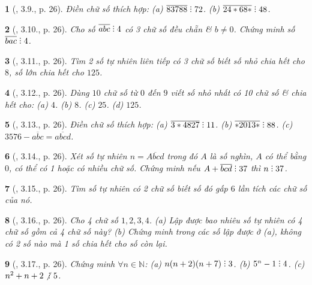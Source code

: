 \documentclass{article}
\newtheorem{baitoan}{}
\DeclareRobustCommand{\divby}{%
	\mathrel{\vbox{\baselineskip.65ex\lineskiplimit0pt\hbox{.}\hbox{.}\hbox{.}}}%
}
\begin{document}
\begin{baitoan}[\cite{TLCT_THCS_Toan_6_so_hoc}, 3.9., p. 26]
	Điền chữ số thích hợp: (a) $\overline{83788}\divby72$. (b) $\overline{24*68*}\divby48$.
\end{baitoan}

\begin{baitoan}[\cite{TLCT_THCS_Toan_6_so_hoc}, 3.10., p. 26]
	Cho số $\overline{abc}\divby4$ có 3 chữ số đều chẵn \& $b\ne0$. Chứng minh số $\overline{bac}\divby4$.
\end{baitoan}

\begin{baitoan}[\cite{TLCT_THCS_Toan_6_so_hoc}, 3.11., p. 26]
	Tìm 2 số tự nhiên liên tiếp có 3 chữ số biết số nhỏ chia hết cho $8$, số lớn chia hết cho $125$.
\end{baitoan}

\begin{baitoan}[\cite{TLCT_THCS_Toan_6_so_hoc}, 3.12., p. 26]
	Dùng $10$ chữ số từ $0$ đến $9$ viết số nhỏ nhất có 10 chữ số \& chia hết cho: (a) $4$. (b) $8$. (c) $25$. (d) $125$.
\end{baitoan}

\begin{baitoan}[\cite{TLCT_THCS_Toan_6_so_hoc}, 3.13., p. 26]
	Điền chữ số thích hợp: (a) $\overline{3*4827}\divby11$. (b) $\overline{*2013*}\divby88$. (c) $3576 - \overline{abc} = \overline{abcd}$.
\end{baitoan}

\begin{baitoan}[\cite{TLCT_THCS_Toan_6_so_hoc}, 3.14., p. 26]
	Xét số tự nhiên $n = \overline{Abcd}$ trong đó $A$ là số nghìn, $A$ có thể bằng $0$, có thể có 1 hoặc có nhiều chữ số. Chứng minh nếu $A + \overline{bcd}\divby37$ thì $n\divby37$.
\end{baitoan}

\begin{baitoan}[\cite{TLCT_THCS_Toan_6_so_hoc}, 3.15., p. 26]
	Tìm số tự nhiên có 2 chữ số biết số đó gấp $6$ lần tích các chữ số của nó.
\end{baitoan}

\begin{baitoan}[\cite{TLCT_THCS_Toan_6_so_hoc}, 3.16., p. 26]
	Cho 4 chữ số $1,2,3,4$. (a) Lập được bao nhiêu số tự nhiên có 4 chữ số gồm cả 4 chữ số này? (b) Chứng minh trong các số lập được ở (a), không có 2 số nào mà 1 số chia hết cho số còn lại.
\end{baitoan}

\begin{baitoan}[\cite{TLCT_THCS_Toan_6_so_hoc}, 3.17., p. 26]
	Chứng minh $\forall n\in\mathbb{N}$: (a) $n(n + 2)(n + 7)\divby3$. (b) $5^n - 1\divby4$. (c) $n^2 + n + 2\not{\divby}\ 5$.
\end{baitoan}
\end{document}

